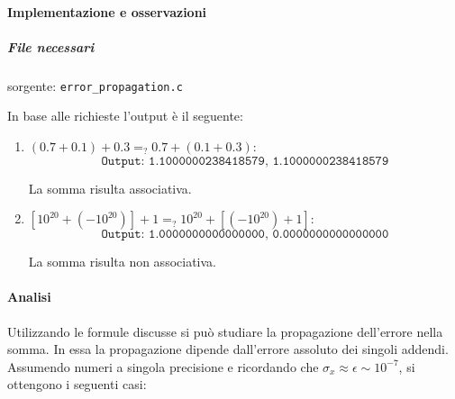 \paragraph{Implementazione e osservazioni}

\subparagraph{File necessari} sorgente: \texttt{error\_propagation.c}

In base alle richieste l'output è il seguente:

\begin{enumerate}

	\item $(0.7 + 0.1) + 0.3 =_? 0.7 + (0.1 + 0.3)$:
	      $$\texttt{Output: 1.1000000238418579, 1.1000000238418579}$$

	      La somma risulta associativa.

	\item $[10^{20} + (−10^{20})] + 1 =_? 10^{20} + [(−10^{20}) + 1]$:
	      $$\texttt{Output: 1.0000000000000000, 0.0000000000000000}$$

	      La somma risulta non associativa.
\end{enumerate}

\paragraph{Analisi}

Utilizzando le formule discusse si può studiare la propagazione dell’errore nella somma.
In essa la propagazione dipende dall’errore assoluto dei singoli addendi.
Assumendo numeri a singola precisione e ricordando che $ \sigma_x \approx \epsilon \sim 10^{−7}$,
si ottengono i seguenti casi:

